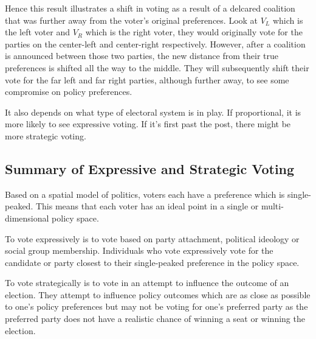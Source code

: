 \documentclass[12pt, letterpaper]{article}
\begin{document}
\begin{enumerate}
\begin{center}
	\end{center}
	
	Hence this result illustrates a shift in voting as a result of a delcared coalition that was further away from the voter's original preferences. Look at $V_L$ which is the left voter and $V_R$ which is the right voter, they would originally vote for the parties on the center-left and center-right respectively. However, after a coalition is announced between those two parties, the new distance from their true preferences is shifted all the way to the middle. They will subsequently shift their vote for the far left and far right parties, although further away, to see some compromise on policy preferences.
\end{enumerate}
It also depends on what type of electoral system is in play. If proportional, it is more likely to see expressive voting. If it's first past the post, there might be more strategic voting.

\subsection{Summary of Expressive and Strategic Voting}
Based on a spatial model of politics, voters each have a preference which is single-peaked. This means that each voter has an ideal point in a single or multi-dimensional policy space.

To vote expressively is to vote based on party attachment, political ideology or social group membership. Individuals who vote expressively vote for the candidate or party closest to their single-peaked preference in the policy space.

To vote strategically is to vote in an attempt to influence the outcome of an election. They attempt to influence policy outcomes which are as close as possible to one's policy preferences but may not be voting for one's preferred party as the preferred party does not have a realistic chance of winning a seat or winning the election.
\end{document}
